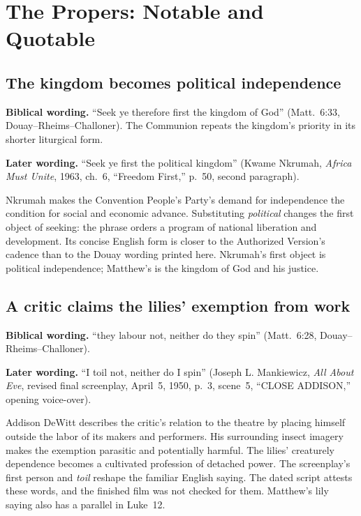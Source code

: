 \section*{The Propers: Notable and Quotable}

\subsection*{The kingdom becomes political independence\enspace{}}

\textbf{Biblical wording.} ``Seek ye therefore first the kingdom of God''
(Matt.~6:33, Douay--Rheims--Challoner). The Communion repeats the kingdom's
priority in its shorter liturgical form.

\textbf{Later wording.} ``Seek ye first the political kingdom'' (Kwame
Nkrumah, \emph{Africa Must Unite}, 1963, ch.~6, ``Freedom First,'' p.~50,
second paragraph).

Nkrumah makes the Convention People's Party's demand for independence the
condition for social and economic advance. Substituting \emph{political}
changes the first object of seeking: the phrase orders a program of national
liberation and development. Its concise English form is closer to the
Authorized Version's cadence than to the Douay wording printed here.
Nkrumah's first object is political independence; Matthew's is the kingdom
of God and his justice.

\subsection*{A critic claims the lilies' exemption from work\enspace{}}

\textbf{Biblical wording.} ``they labour not, neither do they spin''
(Matt.~6:28, Douay--Rheims--Challoner).

\textbf{Later wording.} ``I toil not, neither do I spin'' (Joseph L.
Mankiewicz, \emph{All About Eve}, revised final screenplay, April~5, 1950,
p.~3, scene~5, ``CLOSE ADDISON,'' opening voice-over).

Addison DeWitt describes the critic's relation to the theatre by placing
himself outside the labor of its makers and performers. His surrounding
insect imagery makes the exemption parasitic and potentially harmful. The
lilies' creaturely dependence becomes a cultivated profession of detached
power. The screenplay's first person and \emph{toil} reshape the familiar
English saying. The dated script attests these words, and the finished film
was not checked for them. Matthew's lily saying also has a parallel in
Luke~12.

